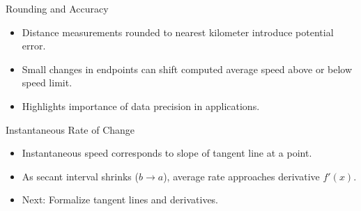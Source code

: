 \documentclass{beamer}
\begin{document}
\begin{frame}{Rounding and Accuracy}
  \begin{itemize}
    \item Distance measurements rounded to nearest kilometer introduce potential error.
    \item Small changes in endpoints can shift computed average speed above or below speed limit.
    \item Highlights importance of data precision in applications.
  \end{itemize}
\end{frame}

\begin{frame}{Instantaneous Rate of Change}
  \begin{itemize}
    \item Instantaneous speed corresponds to slope of tangent line at a point.
    \item As secant interval shrinks ($b\to a$), average rate approaches derivative $f'(x)$.
    \item Next: Formalize tangent lines and derivatives.
  \end{itemize}
\end{frame}
\end{document}
